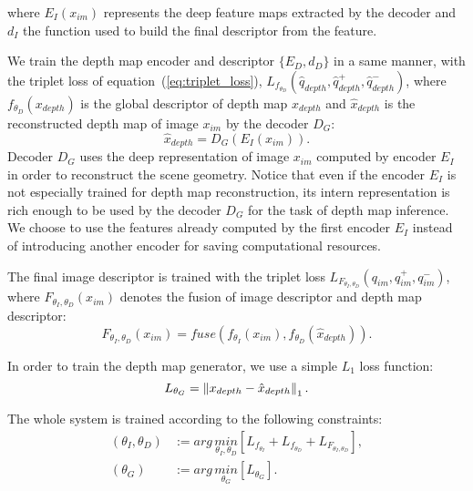 where $E_I(x_{im})$ represents the deep feature maps extracted by the decoder and $d_I$ the function used to build the final descriptor from the feature.

We train the depth map encoder and descriptor $\{E_D, d_D\}$ in a same manner, with the triplet loss of equation~(\ref{eq:triplet_loss}), $L_{f_{\theta_{D}}}(\hat{q}_{depth}, \hat{q}_{depth}^+, \hat{q}_{depth}^-)$, where $f_{\theta_{D}}(x_{depth})$ is the global descriptor of depth map $x_{depth}$ and $\hat{x}_{depth}$ is the reconstructed depth map of image $x_{im}$ by the decoder $D_G$:
\begin{equation}
	\label{eq:generator}
	\hat{x}_{depth} = D_G(E_I(x_{im})).
\end{equation}
Decoder $D_G$ uses the deep representation of image $x_{im}$ computed by encoder $E_I$ in order to reconstruct the scene geometry. Notice that even if the encoder $E_I$ is not especially trained for depth map reconstruction, its intern representation is rich enough to be used by the decoder $D_G$ for the task of depth map inference. We choose to use the features already computed by the first encoder $E_I$ instead of introducing another encoder for saving computational resources.

The final image descriptor is trained with the triplet loss $L_{F_{\theta_{I}, \theta_{D}}}({q}_{im}, {q}_{im}^+, {q}_{im}^-)$, where $F_{\theta_{I},\theta_{D}}(x_{im})$ denotes the fusion of image descriptor and depth map descriptor: 
\begin{equation}
	\label{eq:desc_fuse}
	F_{\theta_{I},\theta_{D}}(x_{im}) = fuse \left( f_{\theta_{I}}(x_{im}), f_{\theta_{D}}(\hat{x}_{depth}) \right).
\end{equation}

In order to train the depth map generator, we use a simple $L_1$ loss function:
\begin{equation}
 \label{eq:l1_loss}
	L_{\theta_{G}} = \left\lVert x_{depth} - \hat{x}_{depth}\right\rVert_{1}.
\end{equation}

The whole system is trained according to the following constraints:
\begin{align}
	\left( \theta_{I}, \theta_{D} \right) & := arg\,\underset{\theta_{I}, \theta_{D}}{min} \left[ L_{f_{\theta_{I}}} + L_{f_{\theta_{D}}} + L_{F_{\theta_{I},\theta_{D}}} \right], \label{eq:sys_optimization_1} \\ 	
	\left( \theta_{G} \right) & := arg\,\underset{\theta_{G}}{min} \left[ L_{\theta_{G}} \right]. 	\label{eq:sys_optimization_2}
\end{align}

